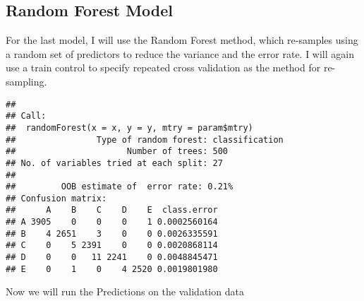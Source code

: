 \documentclass[]{article}
\newenvironment{Shaded}{\begin{snugshade}}{\end{snugshade}}
\newcommand{\CommentTok}[1]{\textcolor[rgb]{0.56,0.35,0.01}{\textit{#1}}}
\newcommand{\DataTypeTok}[1]{\textcolor[rgb]{0.13,0.29,0.53}{#1}}
\newcommand{\DecValTok}[1]{\textcolor[rgb]{0.00,0.00,0.81}{#1}}
\newcommand{\KeywordTok}[1]{\textcolor[rgb]{0.13,0.29,0.53}{\textbf{#1}}}
\newcommand{\NormalTok}[1]{#1}
\newcommand{\OperatorTok}[1]{\textcolor[rgb]{0.81,0.36,0.00}{\textbf{#1}}}
\newcommand{\OtherTok}[1]{\textcolor[rgb]{0.56,0.35,0.01}{#1}}
\newcommand{\StringTok}[1]{\textcolor[rgb]{0.31,0.60,0.02}{#1}}
\begin{document}
\hypertarget{random-forest-model}{%
\subsection{Random Forest Model}\label{random-forest-model}}

For the last model, I will use the Random Forest method, which
re-samples using a random set of predictors to reduce the variance and
the error rate. I will again use a train control to specify repeated
cross validation as the method for re-sampling.

\begin{Shaded}
\end{Shaded}

\begin{verbatim}
## 
## Call:
##  randomForest(x = x, y = y, mtry = param$mtry) 
##                Type of random forest: classification
##                      Number of trees: 500
## No. of variables tried at each split: 27
## 
##         OOB estimate of  error rate: 0.21%
## Confusion matrix:
##      A    B    C    D    E  class.error
## A 3905    0    0    0    1 0.0002560164
## B    4 2651    3    0    0 0.0026335591
## C    0    5 2391    0    0 0.0020868114
## D    0    0   11 2241    0 0.0048845471
## E    0    1    0    4 2520 0.0019801980
\end{verbatim}

Now we will run the Predictions on the validation data

\begin{Shaded}
\end{Shaded}
\end{document}
